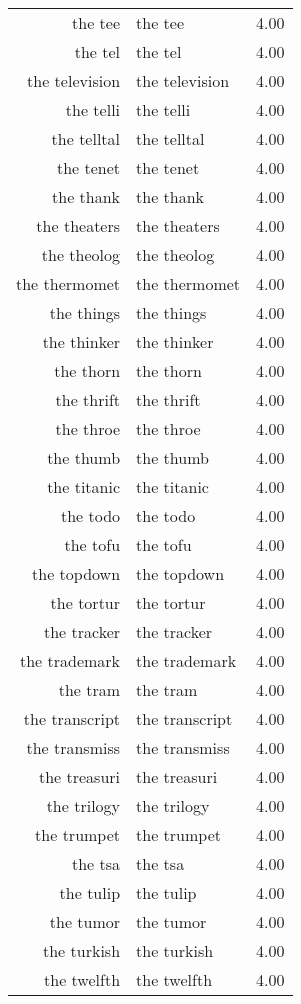 \begin{table}[ht]
\begin{tabular}{rlr}
  the tee & the tee & 4.00 \\ 
  the tel & the tel & 4.00 \\ 
  the television & the television & 4.00 \\ 
  the telli & the telli & 4.00 \\ 
  the telltal & the telltal & 4.00 \\ 
  the tenet & the tenet & 4.00 \\ 
  the thank & the thank & 4.00 \\ 
  the theaters & the theaters & 4.00 \\ 
  the theolog & the theolog & 4.00 \\ 
  the thermomet & the thermomet & 4.00 \\ 
  the things & the things & 4.00 \\ 
  the thinker & the thinker & 4.00 \\ 
  the thorn & the thorn & 4.00 \\ 
  the thrift & the thrift & 4.00 \\ 
  the throe & the throe & 4.00 \\ 
  the thumb & the thumb & 4.00 \\ 
  the titanic & the titanic & 4.00 \\ 
  the todo & the todo & 4.00 \\ 
  the tofu & the tofu & 4.00 \\ 
  the topdown & the topdown & 4.00 \\ 
  the tortur & the tortur & 4.00 \\ 
  the tracker & the tracker & 4.00 \\ 
  the trademark & the trademark & 4.00 \\ 
  the tram & the tram & 4.00 \\ 
  the transcript & the transcript & 4.00 \\ 
  the transmiss & the transmiss & 4.00 \\ 
  the treasuri & the treasuri & 4.00 \\ 
  the trilogy & the trilogy & 4.00 \\ 
  the trumpet & the trumpet & 4.00 \\ 
  the tsa & the tsa & 4.00 \\ 
  the tulip & the tulip & 4.00 \\ 
  the tumor & the tumor & 4.00 \\ 
  the turkish & the turkish & 4.00 \\ 
  the twelfth & the twelfth & 4.00 \\ 

\end{tabular}
\end{table}
